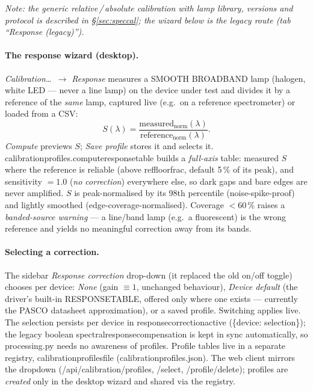 \documentclass[12pt,a4paper]{article}
\DeclareRobustCommand{\code}[1]{{\ttfamily\small\def\_{\rawus\allowbreak}#1}}
\DeclareRobustCommand{\file}[1]{{\ttfamily\small\def\_{\rawus\allowbreak}#1}}
\DeclareRobustCommand{\key}[1]{{\ttfamily\small\color{acc2}\def\_{\rawus\allowbreak}#1}}
\begin{document}
\emph{Note: the generic relative\,/\,absolute calibration with lamp library, versions and protocol is described in \S\ref{sec:speccal}; the wizard below is the legacy route (tab ``Response (legacy)'').}

\paragraph{The response wizard (desktop).} \emph{Calibration\ldots\ $\to$
Response} measures a SMOOTH BROADBAND lamp (halogen, white LED --- never a line
lamp) on the device under test and divides it by a reference of the \emph{same}
lamp, captured live (e.g.\ on a reference spectrometer) or loaded from a CSV:
\[
  S(\lambda) = \frac{\text{measured}_{\mathrm{norm}}(\lambda)}
                    {\text{reference}_{\mathrm{norm}}(\lambda)} .
\]
\emph{Compute} previews $S$; \emph{Save profile} stores it and selects it.
\code{calibration\_profiles.compute\_response\_table} builds a \emph{full-axis}
table: measured $S$ where the reference is reliable (above
\key{ref\_floor\_frac}, default 5\,\% of its peak), and sensitivity $=1.0$
(\emph{no correction}) everywhere else, so dark gaps and bare edges are never
amplified. $S$ is peak-normalised by its 98th percentile (noise-spike-proof) and
lightly smoothed (edge-coverage-normalised). Coverage $<60\,\%$ raises a
\emph{banded-source warning} --- a line/band lamp (e.g.\ a fluorescent) is the
wrong reference and yields no meaningful correction away from its bands.

\paragraph{Selecting a correction.} The sidebar \emph{Response correction}
drop-down (it replaced the old on/off toggle) chooses per device: \emph{None}
(gain $\equiv 1$, unchanged behaviour), \emph{Device default} (the driver's
built-in \code{RESPONSE\_TABLE}, offered only where one exists --- currently the
PASCO datasheet approximation), or a saved profile. Switching applies live. The
selection persists per device in \key{response\_correction\_active}
(\code{\{device: selection\}}); the legacy boolean
\key{spectral\_response\_compensation} is kept in sync automatically, so
\file{processing.py} needs no awareness of profiles. Profile tables live in a
separate registry, \key{calibration\_profiles\_file}
(\file{calibration\_profiles.json}). The web client mirrors the dropdown
(\code{/api/calibration/profiles}, \code{/select}, \code{/profile/delete});
profiles are \emph{created} only in the desktop wizard and shared via the registry.
\end{document}
